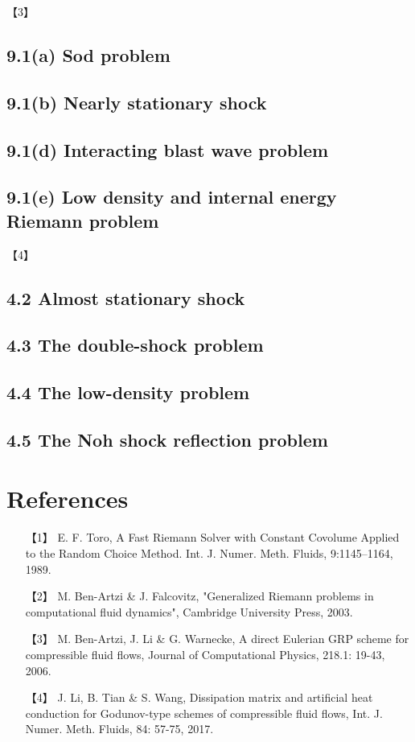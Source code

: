 \documentclass[CJK]{ctexart}
\begin{document}
【3】

\subsection*{9.1(a) Sod problem}

\subsection*{9.1(b) Nearly stationary shock}

\subsection*{9.1(d) Interacting blast wave problem}

\subsection*{9.1(e) Low density and internal energy Riemann problem}


【4】

\subsection*{4.2 Almost stationary shock}

\subsection*{4.3 The double-shock problem}

\subsection*{4.4 The low-density problem}

\subsection*{4.5 The Noh shock reflection problem}


\section*{References}

\begin{itemize}
\item[【1】] E. F. Toro, A Fast Riemann Solver with Constant Covolume Applied to the Random Choice Method. Int. J. Numer. Meth. Fluids, 9:1145–1164, 1989.

\item[【2】] M. Ben-Artzi \& J. Falcovitz, "Generalized Riemann problems in computational fluid dynamics", Cambridge University Press, 2003.

\item[【3】] M. Ben-Artzi, J. Li \& G. Warnecke, A direct Eulerian GRP scheme for compressible fluid flows, Journal of Computational Physics, 218.1: 19-43, 2006.

\item[【4】] J. Li, B. Tian \& S. Wang, Dissipation matrix and artificial heat conduction for Godunov-type schemes of compressible fluid flows, Int. J. Numer. Meth. Fluids, 84: 57-75, 2017.
\end{itemize}
\end{document}
